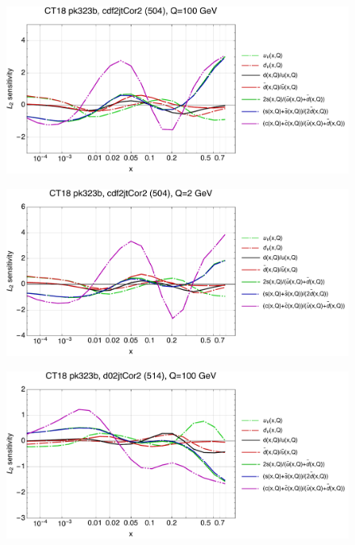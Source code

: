 \documentclass[10pt,aps,prd,floatfix,titlepage]{revtex4}
\begin{document}
\clearpage
\begin{figure}
\includegraphics[width=\textwidth,height=0.44\textheight,keepaspectratio]{2/504_ct18nn_q100_Sf_2.pdf}
\caption{}
\end{figure}
\begin{figure}
\includegraphics[width=\textwidth,height=0.44\textheight,keepaspectratio]{2/504_ct18nn_q2_Sf_2.pdf}
\caption{}
\end{figure}
\clearpage
\begin{figure}
\includegraphics[width=\textwidth,height=0.44\textheight,keepaspectratio]{2/514_ct18nn_q100_Sf_2.pdf}
\caption{}
\end{figure}
\end{document}
